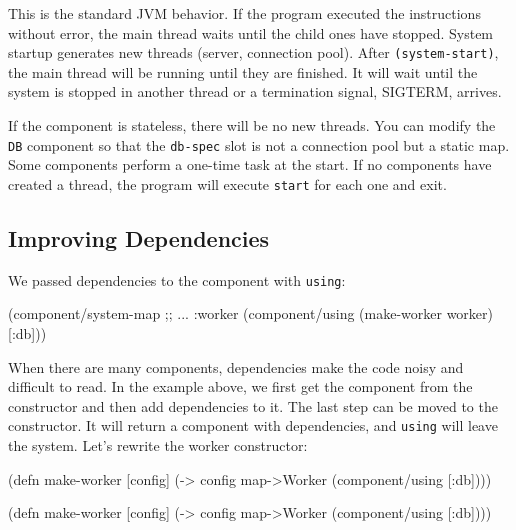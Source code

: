 This is the standard JVM behavior. If the program executed the instructions without error, the main thread waits until the child ones have stopped. System startup generates new threads (server, connection pool). After \verb|(system-start)|, the main thread will be running until they are finished. It will wait until the system is stopped in another thread or a termination signal, SIGTERM, arrives.

If the component is stateless, there will be no new threads. You can modify the \verb|DB| component so that the \verb|db-spec| slot is not a connection pool but a static map. Some components perform a one-time task at the start. If no components have created a thread, the program will execute \verb|start| for each one and exit.

\subsection{Improving Dependencies}


We passed dependencies to the component with \verb|using|:

\begin{english}
  \begin{clojure}
(component/system-map
 ;; ...
 :worker (component/using
          (make-worker worker) [:db]))
  \end{clojure}
\end{english}

When there are many components, dependencies make the code noisy and difficult to read. In the example above, we first get the component from the constructor and then add dependencies to it. The last step can be moved to the constructor. It will return a component with dependencies, and \verb|using| will leave the system. Let's rewrite the worker constructor:

\ifnarrow

\begin{english}
  \begin{clojure}
(defn make-worker [config]
  (-> config
      map->Worker
      (component/using [:db])))
  \end{clojure}
\end{english}

\else

\begin{english}
  \begin{clojure}
(defn make-worker [config]
  (-> config map->Worker (component/using [:db])))
  \end{clojure}
\end{english}

